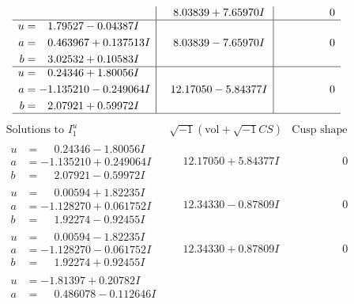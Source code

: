 \documentclass[1p]{elsarticle_modified}
\theoremstyle{definition}
\newcommand{\I}{\sqrt{-1}}
\begin{document}
$$\begin{array}{c|c|c}
 & \phantom{-}8.03839 + 7.65970 I & \phantom{-0.000000 } 0 \\ \hline\begin{aligned}
u &= \phantom{-}1.79527 - 0.04387 I \\
a &= \phantom{-}0.463967 + 0.137513 I \\
b &= \phantom{-}3.02532 + 0.10583 I\end{aligned}
 & \phantom{-}8.03839 - 7.65970 I & \phantom{-0.000000 } 0 \\ \hline\begin{aligned}
u &= \phantom{-}0.24346 + 1.80056 I \\
a &= -1.135210 - 0.249064 I \\
b &= \phantom{-}2.07921 + 0.59972 I\end{aligned}
 & \phantom{-}12.17050 - 5.84377 I & \phantom{-0.000000 } 0\\
 \hline 
 \end{array}$$\newpage$$\begin{array}{c|c|c}  
\text{Solutions to }I^u_{1}& \I (\text{vol} + \sqrt{-1}CS) & \text{Cusp shape}\\
 \hline 
\begin{aligned}
u &= \phantom{-}0.24346 - 1.80056 I \\
a &= -1.135210 + 0.249064 I \\
b &= \phantom{-}2.07921 - 0.59972 I\end{aligned}
 & \phantom{-}12.17050 + 5.84377 I & \phantom{-0.000000 } 0 \\ \hline\begin{aligned}
u &= \phantom{-}0.00594 + 1.82235 I \\
a &= -1.128270 + 0.061752 I \\
b &= \phantom{-}1.92274 - 0.92455 I\end{aligned}
 & \phantom{-}12.34330 - 0.87809 I & \phantom{-0.000000 } 0 \\ \hline\begin{aligned}
u &= \phantom{-}0.00594 - 1.82235 I \\
a &= -1.128270 - 0.061752 I \\
b &= \phantom{-}1.92274 + 0.92455 I\end{aligned}
 & \phantom{-}12.34330 + 0.87809 I & \phantom{-0.000000 } 0 \\ \hline\begin{aligned}
u &= -1.81397 + 0.20782 I \\
a &= \phantom{-}0.486078 - 0.112646 I \\

\end{aligned}
\end{array}$$
\end{document}
